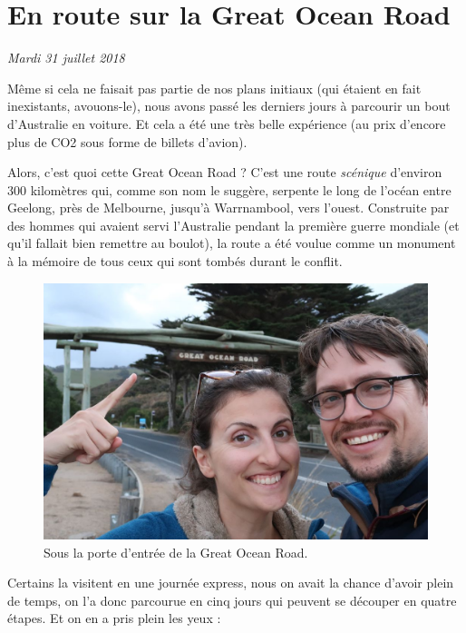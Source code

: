 \hypertarget{en-route-sur-la-great-ocean-road}{%
\section{En route sur la Great Ocean
Road}\label{en-route-sur-la-great-ocean-road}}

\emph{Mardi 31 juillet 2018}

Même si cela ne faisait pas partie de nos plans initiaux (qui étaient en
fait inexistants, avouons-le), nous avons passé les derniers jours à
parcourir un bout d'Australie en voiture. Et cela a été une très belle
expérience (au prix d'encore plus de CO2 sous forme de billets d'avion).

Alors, c'est quoi cette Great Ocean Road ? C'est une route
\emph{scénique} d'environ 300 kilomètres qui, comme son nom le suggère,
serpente le long de l'océan entre Geelong, près de Melbourne, jusqu'à
Warrnambool, vers l'ouest. Construite par des hommes qui avaient servi
l'Australie pendant la première guerre mondiale (et qu'il fallait bien
remettre au boulot), la route a été voulue comme un monument à la
mémoire de tous ceux qui sont tombés durant le conflit.

\begin{figure}
\centering
\includegraphics{images/20180731_greatoceanroad.JPG}
\caption{Sous la porte d'entrée de la Great Ocean Road.}
\end{figure}

Certains la visitent en une journée express, nous on avait la chance
d'avoir plein de temps, on l'a donc parcourue en cinq jours qui peuvent
se découper en quatre étapes. Et on en a pris plein les yeux :

\hypertarget{mapid}{}

